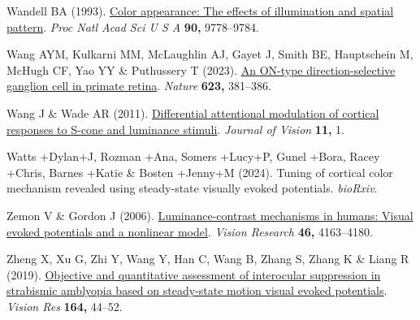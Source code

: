 \documentclass[
  letterpaper,
  DIV=11,
  numbers=noendperiod]{scrartcl}
\newlength{\cslhangindent}
\newenvironment{CSLReferences}[2] %
 {\begin{list}{}{%
  \setlength{\itemindent}{0pt}
  \setlength{\leftmargin}{0pt}
  \setlength{\parsep}{0pt}
  \ifodd #1
   \setlength{\leftmargin}{\cslhangindent}
   \setlength{\itemindent}{-1\cslhangindent}
  \fi
  \setlength{\itemsep}{#2\baselineskip}}}
 {\end{list}}
\begin{document}
\begin{CSLReferences}{1}{1}
Wandell BA (1993). \href{https://doi.org/10.1073/pnas.90.21.9778}{Color
appearance: The effects of illumination and spatial pattern}. \emph{Proc
Natl Acad Sci U S A} \textbf{90,} 9778--9784.

Wang AYM, Kulkarni MM, McLaughlin AJ, Gayet J, Smith BE, Hauptschein M,
McHugh CF, Yao YY \& Puthussery T (2023).
\href{https://doi.org/10.1038/s41586-023-06659-4}{An ON-type
direction-selective ganglion cell in primate retina}. \emph{Nature}
\textbf{623,} 381--386.

Wang J \& Wade AR (2011).
\href{https://doi.org/10.1167/11.6.1}{Differential attentional
modulation of cortical responses to {S}-cone and luminance stimuli}.
\emph{Journal of Vision} \textbf{11,} 1.

Watts +Dylan+J, Rozman +Ana, Somers +Lucy+P, Gunel +Bora, Racey +Chris,
Barnes +Katie \& Bosten +Jenny+M (2024). Tuning of cortical color
mechanism revealed using steady-state visually evoked potentials.
\emph{bioRxiv}.

Zemon V \& Gordon J (2006).
\href{https://doi.org/10.1016/j.visres.2006.07.007}{Luminance-contrast
mechanisms in humans: Visual evoked potentials and a nonlinear model}.
\emph{Vision Research} \textbf{46,} 4163--4180.

Zheng X, Xu G, Zhi Y, Wang Y, Han C, Wang B, Zhang S, Zhang K \& Liang R
(2019). \href{https://doi.org/10.1016/j.visres.2019.07.003}{Objective
and quantitative assessment of interocular suppression in strabismic
amblyopia based on steady-state motion visual evoked potentials}.
\emph{Vision Res} \textbf{164,} 44--52.

\end{CSLReferences}
\end{document}

